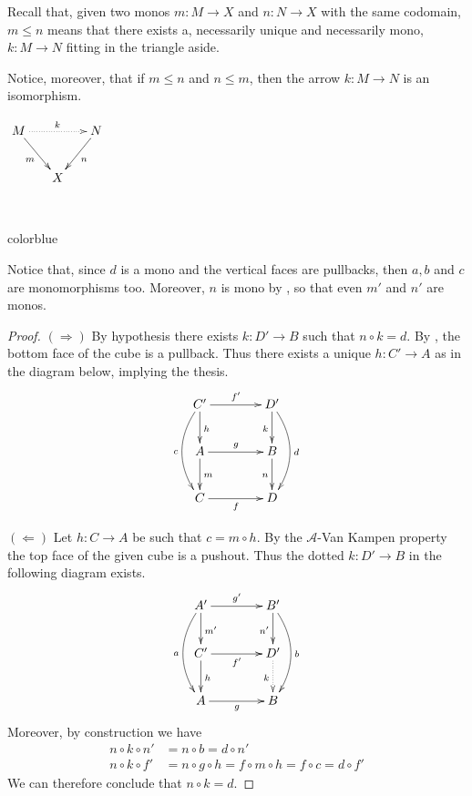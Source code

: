 \documentclass[a4paper,UKenglish,cleveref,pdftex,thm-restate,numberwithinsect,anonymous]{lipics}
\newcommand{\full}[1]{{color{blue}#1}}
\newcommand{\full}[1]{}
\begin{document}
\noindent 
\parbox{11cm}{\begin{remark}
	Recall that, given two monos $m:M\to X$ and $n:N\to X$ with the same codomain, $m\leq n$ means that there exists a, necessarily unique and necessarily mono, $k:M\to N$ fitting in the triangle aside.	
	
	\hspace{15pt}Notice, moreover, that  if $m\leq n$ and $n\leq m$, then the arrow $k:M\to N$ is an isomorphism.
\end{remark}}
\parbox{4cm}{$\xymatrix@C=15pt{M\ar@{.>}[rr]^{k}  \ar[dr]_{m}&& N \ar[dl]^{n}\\ & X}$}\\

\full{ 
\begin{remark}
	Notice that, since $d$ is a mono and the vertical faces are pullbacks, then $a, b$ and $c$ are monomorphisms too. Moreover, $n$ is mono by \Cref{prop:pbpo}, so that even $m'$ and $n'$ are monos.
\end{remark}

\begin{proof}
	$(\Rightarrow)$ By hypothesis there exists $k:D'\to B$ such that $n\circ k = d$. By \Cref{prop:pbpo}, the bottom face of the cube is a pullback. Thus there exists a unique $h:C'\to A$ as in the diagram below, implying the thesis.
	\[\xymatrix@C=40pt{C'  \ar[d]^{h}\ar[r]^{f'} \ar@/_.5cm/[dd]_{c}& D' \ar@/^.5cm/[dd]^{d}\ar[d]_{k}\\ A \ar[d]^{m} \ar[r]^{g} & B \ar[d]_{n} \\  C \ar[r]_f & D}\]

	\smallskip \noindent
	$(\Leftarrow)$ Let $h:C\to A$ be such that $c=m\circ h$. By the $\mathcal{A}$-Van Kampen property the top face of the given cube is a pushout. Thus the dotted $k:D'\to B$ in the following diagram exists.
	\[\xymatrix@C=40pt{A' \ar@/_.5cm/[dd]_{a} \ar[d]^{m'} \ar[r]^{g'} & B' \ar[d]_{n'} \ar@/^.5cm/[dd]^{b} \\  C' \ar[d]^{h} \ar[r]_{f'} & D' \ar@{.>}[d]_{k}\\ A \ar[r]_g& B }\]
	Moreover, by construction we have
	\begin{align*}
		n\circ k \circ n' & = n\circ b=d\circ n'                                  \\
		n\circ k \circ f' & = n\circ g\circ h=f\circ m\circ h=f\circ c= d\circ f'
	\end{align*}
	We can therefore conclude that $n\circ k =d$.
\end{proof}}
\end{document}
